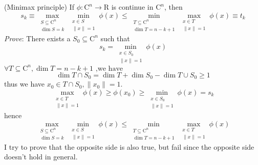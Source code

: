 \documentclass[a4paper,12pt]{article}
\begin{document}
(Minimax principle) If $\phi \colon \mathrm{C}^n \to \mathrm{R}$ is continue in $\mathrm{C}^n$, then
\[ s_k \equiv \max_{\begin{matrix} S \subseteq \mathrm{C}^n \\ \dim S = k \end{matrix} } \min_{\begin{matrix} x \in S \\ \|x\|=1 \end{matrix} } \phi(x) \leq
\min_{\begin{matrix} T \subseteq \mathrm{C}^n \\ \dim T = n-k+1 \end{matrix}} \max_{\begin{matrix} x \in T \\ \|x\|=1 \end{matrix} } \phi(x) \equiv t_k \]
\textit{Prove}:
There exists a $S_0 \subseteq \mathrm{C}^n$ such that
\[ s_k = \min_{\begin{matrix} x \in S_0 \\ \|x\|=1 \end{matrix} } \phi(x) \]
$ \forall T \subseteq \mathrm{C}^n,\dim{T}=n-k+1 \text{ ,we have} $
\[ \dim{T \cap S_0} = \dim{T}+\dim{S_0}-\dim{T \cup S_0} \geq 1\]
thus we have $x_0 \in T \cap S_0 , \|x_0\| = 1 $.
\[ \max_{\begin{matrix} x \in T \\ \|x\|=1 \end{matrix} } \phi(x) \geq \phi(x_0) \geq \min_{\begin{matrix} x \in S_0 \\ \|x\|=1 \end{matrix} } \phi(x) = s_k \] 
hence
\[ \max_{\begin{matrix} S \subseteq \mathrm{C}^n \\ \dim S = k \end{matrix} } \min_{\begin{matrix} x \in S \\ \|x\|=1 \end{matrix} } \phi(x) \leq
\min_{\begin{matrix} T \subseteq \mathrm{C}^n \\ \dim T = n-k+1 \end{matrix}} \max_{\begin{matrix} x \in T \\ \|x\|=1 \end{matrix} } \phi(x) \] 
I try to prove that the opposite side is also true, but fail since the opposite side doesn't hold in general. 
\end{document}
